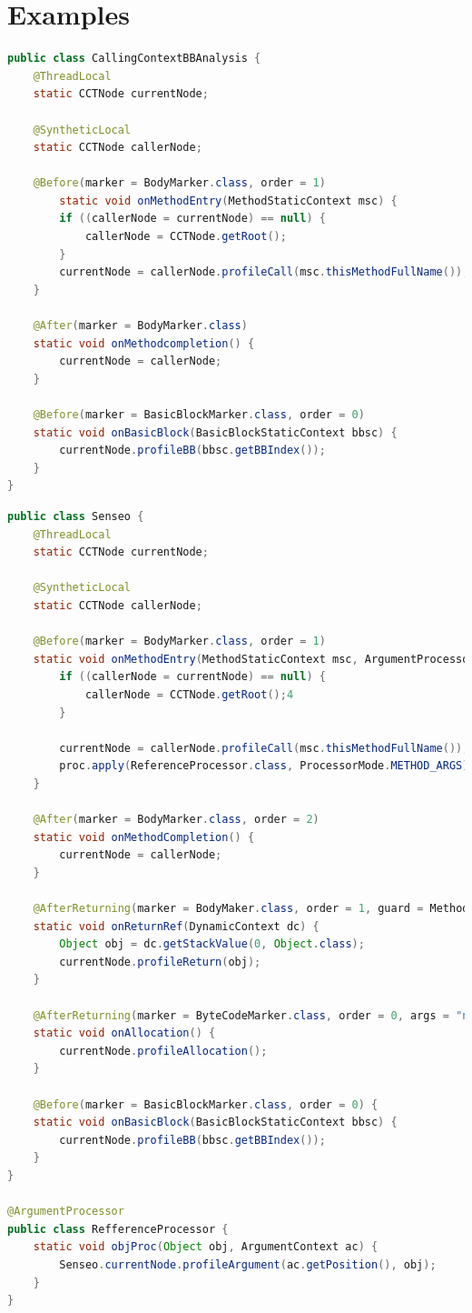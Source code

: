 \documentclass[a4paper]{report}
\begin{document}
\section{Examples}
\begin{lstlisting}[language=Java,caption=Aspect for calling context-aware profiling.,label=lst:DiSL_ExampleProfiler]
public class CallingContextBBAnalysis {
	@ThreadLocal
	static CCTNode currentNode;

	@SyntheticLocal
	static CCTNode callerNode;

	@Before(marker = BodyMarker.class, order = 1)
		static void onMethodEntry(MethodStaticContext msc) {
		if ((callerNode = currentNode) == null) {
			callerNode = CCTNode.getRoot();
		}
		currentNode = callerNode.profileCall(msc.thisMethodFullName());
	}

	@After(marker = BodyMarker.class)
	static void onMethodcompletion() {
		currentNode = callerNode;
	}

	@Before(marker = BasicBlockMarker.class, order = 0)
	static void onBasicBlock(BasicBlockStaticContext bbsc) {
		currentNode.profileBB(bbsc.getBBIndex());
	}
}
\end{lstlisting}
\begin{lstlisting}[language=Java,caption=Example for collecting run-time information.,label=lst:DiSL_ExampleSenseo]
public class Senseo {
	@ThreadLocal
	static CCTNode currentNode;
	
	@SyntheticLocal
	static CCTNode callerNode;	
	
	@Before(marker = BodyMarker.class, order = 1)
	static void onMethodEntry(MethodStaticContext msc, ArgumentProcessorContext proc) {
		if ((callerNode = currentNode) == null) {
			callerNode = CCTNode.getRoot();4
		}
			
		currentNode = callerNode.profileCall(msc.thisMethodFullName());
		proc.apply(ReferenceProcessor.class, ProcessorMode.METHOD_ARGS);
	}
	
	@After(marker = BodyMarker.class, order = 2)
	static void onMethodCompletion() {
		currentNode = callerNode;
	}
	
	@AfterReturning(marker = BodyMaker.class, order = 1, guard = MethodReturnsRef.class)
	static void onReturnRef(DynamicContext dc) {
		Object obj = dc.getStackValue(0, Object.class);
		currentNode.profileReturn(obj);
	}
	
	@AfterReturning(marker = ByteCodeMarker.class, order = 0, args = "new,newarray,anewarray,multianewarray")
	static void onAllocation() {
		currentNode.profileAllocation();
	}
	
	@Before(marker = BasicBlockMarker.class, order = 0) {
	static void onBasicBlock(BasicBlockStaticContext bbsc) {
		currentNode.profileBB(bbsc.getBBIndex());
	}
}

@ArgumentProcessor
public class RefferenceProcessor {
	static void objProc(Object obj, ArgumentContext ac) {
		Senseo.currentNode.profileArgument(ac.getPosition(), obj);
	}
}	
\end{lstlisting}
\end{document}
